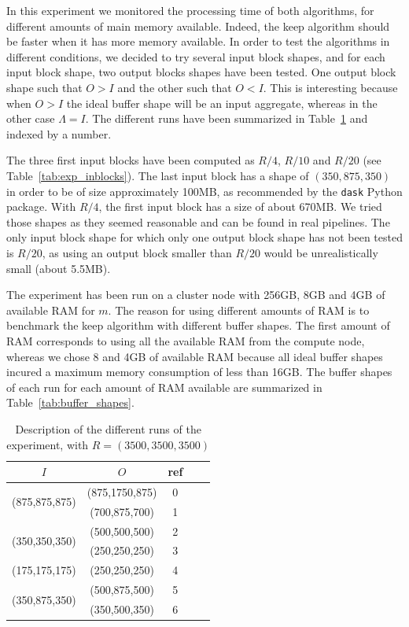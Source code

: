 \documentclass[conference]{IEEEtran}
\begin{document}
In this experiment we monitored the processing time of both algorithms, for
different amounts of main memory available.
Indeed, the keep algorithm should be faster when it has more memory available.
In order to test the algorithms in different conditions, we decided to try
several input block shapes, and for each input block shape, two output blocks
shapes have been tested. One output block shape such that $O>I$ and the other
such that $O<I$. This is interesting because when $O>I$ the ideal buffer shape
will be an input aggregate, whereas in the other case $\Lambda=I$.
The different runs have been summarized in Table~\ref{tab:exp} and indexed by
a number.

The three first input blocks have been computed as $R/4$, $R/10$ and $R/20$
(see Table~\ref{tab:exp_inblocks}).
The last input block has a shape of $(350,875,350)$ in order to be of size
approximately 100MB, as recommended by the \texttt{dask} Python package.
With $R/4$, the first input block has a size of about 670MB.
We tried those shapes as they seemed reasonable and can be found in real pipelines.
The only input block shape for which only one output block shape has not been tested
is $R/20$, as using an output block smaller than $R/20$ would be unrealistically
small (about 5.5MB).

The experiment has been run on a cluster node with 256GB, 8GB and 4GB of
available RAM for $m$.
The reason for using different amounts of RAM is to benchmark the keep algorithm
with different buffer shapes.
The first amount of RAM corresponds to using all the
available RAM from the compute node, whereas we chose 8 and 4GB of available RAM
because all ideal buffer shapes incured a maximum memory consumption of less than
16GB.
The buffer shapes of each run for each amount of RAM available are summarized in
Table~\ref{tab:buffer_shapes}.

\begin{table}[ht]
  \centering
  \caption{Description of the different runs of the experiment, with $R=(3500,3500,3500)$}

   \begin{tabular}[t]{| c | c | c | c | c |}
   \hline
   $I$ & $O$ & ref \\
   \hline
   \multirow{2}{*}{(875,875,875)} & (875,1750,875) & 0 \\
   & (700,875,700) & 1 \\
   \hline
   \multirow{2}{*}{(350,350,350)} & (500,500,500) & 2 \\
   & (250,250,250) & 3 \\
   \hline
   \multirow{1}{*}{(175,175,175)} & (250,250,250) & 4 \\
   \hline
   \multirow{2}{*}{(350,875,350)} & (500,875,500) & 5 \\
   & (350,500,350) & 6 \\
   \hline
   \end{tabular}

   \label{tab:exp}

\end{table}
\end{document}

